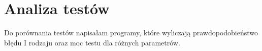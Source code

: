 \chapter{Analiza testów}

Do porównania testów napisałam programy, które wyliczają prawdopodobieństwo błędu I rodzaju oraz moc testu dla różnych parametrów. 

